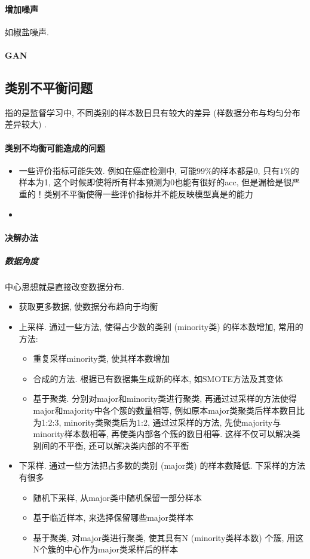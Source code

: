 \paragraph{增加噪声}
如椒盐噪声. 

\paragraph{GAN}


\subsection{类别不平衡问题}
指的是监督学习中, 不同类别的样本数目具有较大的差异 (样数据分布与均匀分布差异较大) . 
\paragraph{类别不均衡可能造成的问题}
\begin{itemize}
	\item 一些评价指标可能失效. 例如在癌症检测中, 可能$99\%$的样本都是0, 只有$1\%$的样本为1, 这个时候即使将所有样本预测为0也能有很好的acc, 但是漏检是很严重的！类别不平衡使得一些评价指标并不能反映模型真是的能力
	\item 
\end{itemize}

\paragraph{决解办法}
\subparagraph{数据角度}
中心思想就是直接改变数据分布. 
\begin{itemize}
	\item 获取更多数据, 使数据分布趋向于均衡
	\item 上采样. 通过一些方法, 使得占少数的类别 (minority类) 的样本数增加, 常用的方法: 
	\begin{itemize}
		\item 重复采样minority类, 使其样本数增加
		\item 合成的方法. 根据已有数据集生成新的样本, 如SMOTE方法及其变体
		\item 基于聚类. 分别对major和minority类进行聚类, 再通过过采样的方法使得major和majority中各个簇的数量相等, 例如原本major类聚类后样本数目比为1:2:3, minority类聚类后为1:2, 通过过采样的方法, 先使majority与minority样本数相等, 再使类内部各个簇的数目相等. 这样不仅可以解决类别间的不平衡, 还可以解决类内部的不平衡
	\end{itemize}
	\item 下采样. 通过一些方法把占多数的类别 (major类) 的样本数降低. 下采样的方法有很多
	\begin{itemize}
		\item 随机下采样, 从major类中随机保留一部分样本
		\item 基于临近样本, 来选择保留哪些major类样本
		\item 基于聚类, 对major类进行聚类, 使其具有N (minority类样本数) 个簇, 用这N个簇的中心作为major类采样后的样本
	\end{itemize}
\end{itemize}

